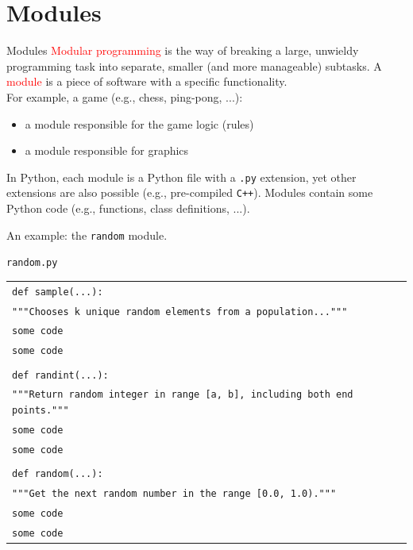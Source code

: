 \documentclass[t,handout,9pt]{beamer}
\begin{document}
\section{Modules}
\begin{frame}{Modules}
\vfill
\textcolor{red}{Modular programming} is the way of breaking a large, unwieldy programming task into separate, smaller (and more manageable) subtasks.
\vfill
A \textcolor{red}{module} is a piece of software with a specific functionality.\\
For example, a game (e.g., chess, ping-pong, ...):
\begin{itemize}
	\item a module responsible for the game logic (rules)
	\item a module responsible for graphics
\end{itemize}
\vfill
In Python, each module is a Python file with a \texttt{.py} extension, yet other extensions are also possible (e.g., pre-compiled \texttt{C++}).
\vfill
Modules contain some Python code (e.g., functions, class definitions, ...).
\vfill
\end{frame}
%
\begin{frame}
An example: the \texttt{random} module.
\begin{center}\texttt{random.py}\end{center}
\begin{table}[]
\begin{flushleft}
\begin{tabular}{ll}
\texttt{def sample(...):}        & \\
\texttt{\quad """Chooses k unique random elements from a population..."""}        & \\
\texttt{\quad some code}        & \\
\texttt{\quad some code}        & \\
\texttt{\quad}        & \\
\texttt{def randint(...):}        & \\
\texttt{\quad """Return random integer in range [a, b], including both end points."""}        & \\
\texttt{\quad some code}        & \\
\texttt{\quad some code}        & \\
\texttt{\quad}        & \\
\texttt{def random(...):}        & \\
\texttt{\quad """Get the next random number in the range [0.0, 1.0)."""}        & \\
\texttt{\quad some code}        & \\
\texttt{\quad some code}        & \\
\end{tabular}
\end{flushleft}
\end{table}
\end{frame}
%
\end{document}

